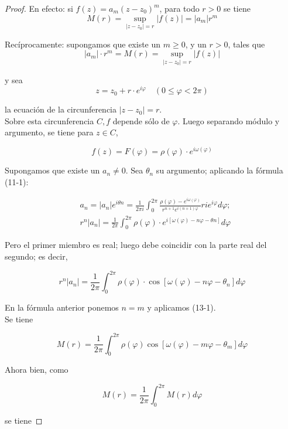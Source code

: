 \documentclass[10pt]{article}
\theoremstyle{plain}
\theoremstyle{definition}
\theoremstyle{remark}
\begin{document}
\begin{proof}
En efecto: si $f(z)=a_{m}(z-z_{0})^{m}$, para todo $r>0$ se tiene
$$M(r)=\sup_{|z-z_{0}|=r}|f(z)|=\left|a_{m}\right| r^{m}$$

Recíprocamente: supongamos que existe un $m \geq 0$, y un $r>0$, tales que
$$\left|a_{m}\right| \cdot r^{m}=M(r)=\sup_{\left|z-z_{0}\right|=r}|f(z)|$$

y sea
$$z=z_{0}+r \cdot e^{i \varphi} \quad(0 \leq \varphi<2 \pi)$$

la ecuación de la circunferencia $\left|z-z_{0}\right|=r$.\\
Sobre esta circunferencia $C, f$ depende sólo de $\varphi$. Luego separando módulo y argumento, se tiene para $z \in C$,

$$
f(z)=F(\varphi)=\rho(\varphi) \cdot e^{i \omega(\varphi)}
$$

Supongamos que existe un $a_{n} \neq 0$. Sea $\theta_{n}$ su argumento; aplicando la fórmula (11-1):

$$
\begin{aligned}
& a_{n}=\left|a_{n}\right| e^{i \theta n}=\frac{1}{2 \pi i} \int_{0}^{2 \pi} \frac{\rho(\varphi)-e^{i \omega(\varphi)}}{r^{n+1} e^{i(n+1) \varphi}} r i e^{i \varphi} d \varphi ; \\
& r^{n}\left|a_{n}\right|=\frac{1}{2 \pi} \int_{0}^{2 \pi} \rho(\varphi) \cdot e^{i[\omega(\varphi)-n \varphi-\theta n]} d \varphi
\end{aligned}
$$

Pero el primer miembro es real; luego debe coincidir con la parte real del segundo; es decir,


\begin{equation*}
r^{n}\left|a_{n}\right|=\frac{1}{2 \pi} \int_{0}^{2 \pi} \rho(\varphi) \cdot \cos \left[\omega(\varphi)-n \varphi-\theta_{n}\right] d \varphi \tag{$13\cdot2$}
\end{equation*}


En la fórmula anterior ponemos $n=m$ y aplicamos (13-1).\\
Se tiene


\begin{equation*}
M(r)=\frac{1}{2 \pi} \int_{0}^{2 \pi} \rho(\varphi) \cos \left[\omega(\varphi)-m \varphi-\theta_{m}\right] d \varphi \tag{13-3}
\end{equation*}


Ahora bien, como

$$
M(r)=\frac{1}{2 \pi} \int_{0}^{2 \pi} M(r) d \varphi
$$

se tiene



\end{proof}
\end{document}
